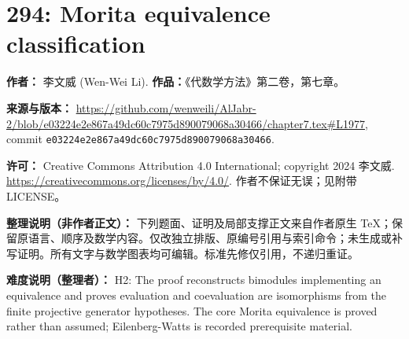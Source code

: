 \documentclass[11pt]{article}
\theoremstyle{definition}
\begin{document}
\section*{294: Morita equivalence classification}
\noindent\textbf{作者：} 李文威 (Wen-Wei Li). \textbf{作品：}《代数学方法》第二卷，第七章。
\par\noindent\textbf{来源与版本：} \url{https://github.com/wenweili/AlJabr-2/blob/e03224e2e867a49dc60c7975d890079068a30466/chapter7.tex#L1977}, commit \texttt{e03224e2e867a49dc60c7975d890079068a30466}.
\par\noindent\textbf{许可：} Creative Commons Attribution 4.0 International; copyright 2024 李文威. \url{https://creativecommons.org/licenses/by/4.0/}. 作者不保证无误；见附带 LICENSE。
\par\noindent\textbf{整理说明（非作者正文）：} 下列题面、证明及局部支撑正文来自作者原生 TeX；保留原语言、顺序及数学内容。仅改独立排版、原编号引用与索引命令；未生成或补写证明。所有文字与数学图表均可编辑。标准先修仅引用，不递归重证。
\par\noindent\textbf{难度说明（整理者）：} H2: The proof reconstructs bimodules implementing an equivalence and proves evaluation and coevaluation are isomorphisms from the finite projective generator hypotheses. The core Morita equivalence is proved rather than assumed; Eilenberg-Watts is recorded prerequisite material.
\end{document}
